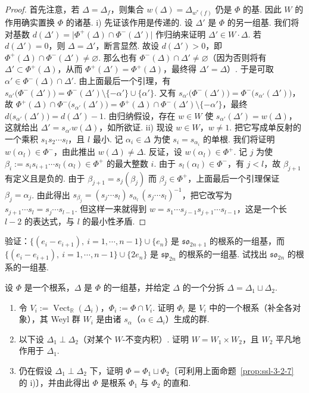 \begin{proof}
首先注意，若 $\Delta=\Delta_f$，则集合 $w(\Delta)=\Delta_{w^{*}(f)}$ 仍是 $\Phi$ 的基. 因此 $W$ 的作用确实置换 $\Phi$ 的诸基.
i) 先证该作用是传递的. 设 $\Delta'$ 是 $\Phi$ 的另一组基. 我们将对基数 $d(\Delta')=\bigl|\Phi^{+}(\Delta)\cap\Phi^{-}(\Delta')\bigr|$ 作归纳来证明 $\Delta'\in W\cdot\Delta$. 若 $d(\Delta')=0$，则 $\Delta=\Delta'$，断言显然. 故设 $d(\Delta')>0$，即 $\Phi^{+}(\Delta)\cap\Phi^{-}(\Delta')\neq\varnothing$. 那么也有 $\Phi^{-}(\Delta)\cap\Delta'\neq\varnothing$（因为否则将有 $\Delta'\subset\Phi^{+}(\Delta)$，从而 $\Phi^{+}(\Delta')=\Phi^{+}(\Delta)$，最终得 $\Delta'=\Delta$）. 于是可取 $\alpha'\in\Phi^{-}(\Delta)\cap\Delta'$. 由上面最后一个引理，有 $s_{\alpha'}\bigl(\Phi^{-}(\Delta')\bigr)=\Phi^{-}(\Delta')\setminus\{-\alpha'\}\cup\{\alpha'\}$. 又有 $s_{\alpha'}\bigl(\Phi^{-}(\Delta')\bigr)=\Phi^{-}\bigl(s_{\alpha'}(\Delta')\bigr)$，故 $\Phi^{+}(\Delta)\cap\Phi^{-}\bigl(s_{\alpha'}(\Delta')\bigr)=\Phi^{+}(\Delta)\cap\Phi^{-}(\Delta')\setminus\{-\alpha'\}$，最终 $d\bigl(s_{\alpha'}(\Delta')\bigr)=d(\Delta')-1$. 由归纳假设，存在 $w\in W$ 使 $s_{\alpha'}(\Delta')=w(\Delta)$，这就给出 $\Delta'=s_{\alpha'}w(\Delta)$，如所欲证.
ii) 现设 $w\in W$，$w\neq 1$. 把它写成单反射的一个乘积 $s_1s_2\cdots s_l$，且 $l$ 最小. 记 $\alpha_i\in\Delta$ 为使 $s_i=s_{\alpha_i}$ 的单根. 我们将证明 $w(\alpha_l)\in\Phi^{-}$，由此推出 $w(\Delta)\neq\Delta$.
反证，设 $w(\alpha_l)\in\Phi^{+}$. 记 $j$ 为使 $\beta_i:=s_is_{i+1}\cdots s_l(\alpha_l)\in\Phi^{+}$ 的最大整数 $i$. 由于 $s_l(\alpha_l)\in\Phi^{-}$，有 $j<l$，故 $\beta_{j+1}$ 有定义且是负的. 由于 $\beta_{j+1}=s_j(\beta_j)$ 而 $\beta_j\in\Phi^{+}$，上面最后一个引理保证 $\beta_j=\alpha_j$. 由此得出 $s_{\beta_j}=(s_j\cdots s_l)\,s_{\alpha_l}\,(s_j\cdots s_l)^{-1}$，把它改写为 $s_{j+1}\cdots s_l=s_j\cdots s_{l-1}$. 但这样一来就得到 $w=s_1\cdots s_{j-1}s_{j+1}\cdots s_{l-1}$，这是一个长 $l-2$ 的表达式，与 $l$ 的最小性矛盾.
\end{proof}
\begin{exercise*}
验证：$\{(e_i-e_{i+1}),\ i=1,\cdots,n-1\}\cup\{e_n\}$ 是 $\mathfrak{so}_{2n+1}$ 的根系的一组基，而 $\{(e_i-e_{i+1}),\ i=1,\cdots,n-1\}\cup\{2e_n\}$ 是 $\mathfrak{sp}_{2n}$ 的根系的一组基. 试找出 $\mathfrak{so}_{2n}$ 的根系的一组基.
\end{exercise*}
\begin{exercise*}
设 $\Phi$ 是一个根系，$\Delta$ 是 $\Phi$ 的一组基，并给定 $\Delta$ 的一个分拆 $\Delta=\Delta_1\sqcup\Delta_2$.
\begin{enumerate}[label=\roman*)]
\item 令 $V_i:=\operatorname{Vect}_{\mathbb R}(\Delta_i)$，$\Phi_i:=\Phi\cap V_i$. 证明 $\Phi_i$ 是 $V_i$ 中的一个根系（补全各对象），其 Weyl 群 $W_i$ 是由诸 $s_{\alpha}$（$\alpha\in\Delta_i$）生成的群.
\item 以下设 $\Delta_1\perp\Delta_2$（对某个 $W$-不变内积）. 证明 $W=W_1\times W_2$，且 $W_2$ 平凡地作用于 $\Delta_1$.
\item 仍在假设 $\Delta_1\perp\Delta_2$ 下，证明 $\Phi=\Phi_1\sqcup\Phi_2$〔可利用上面命题~\ref{prop:ssl-3-2-7} 的 i)〕，并由此得出 $\Phi$ 是根系 $\Phi_1$ 与 $\Phi_2$ 的直和.
\end{enumerate}
\end{exercise*}
